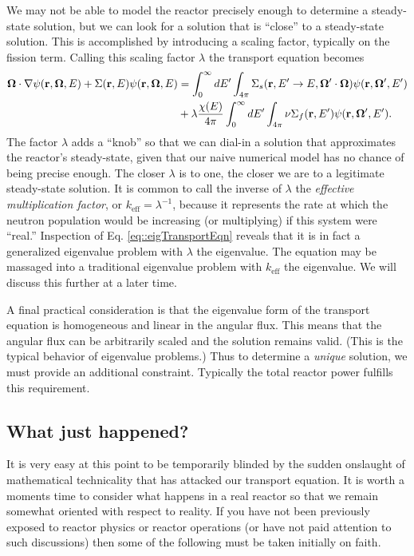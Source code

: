 \documentclass[11pt]{article}
\renewcommand\vec{\mathbf}
\begin{document}
We may not be able to model the reactor precisely enough to determine a steady-state solution, but we can look for a solution that is ``close'' to a steady-state solution.  This is accomplished by introducing a scaling factor, typically on the fission term.  Calling this scaling factor \(\lambda\) the transport equation becomes
\begin{align}
  \vec{\Omega} \cdot \nabla\psi(\vec{r},\vec{\Omega},E)
  + \Sigma(\vec{r},E) \psi(\vec{r},\vec{\Omega},E)
  &= \int_0^\infty dE' \int_{4\pi} \Sigma_s(\vec{r},E' \rightarrow E, \vec{\Omega}'\cdot\vec{\Omega}) \psi(\vec{r},\vec{\Omega}',E') \notag\\
  &+ \lambda\frac{\chi(E)}{4\pi} \int_0^\infty dE' \int_{4\pi} \nu\Sigma_f(\vec{r},E') \psi(\vec{r},\vec{\Omega}',E').
  \label{eq::eigTransportEqn}
\end{align}
The factor \(\lambda\) adds a ``knob'' so that we can dial-in a solution that approximates the reactor's steady-state, given that our naive numerical model has no chance of being precise enough.  The closer \(\lambda\) is to one, the closer we are to a legitimate steady-state solution.  It is common to call the inverse of \(\lambda\) the \emph{effective multiplication factor}, or \(k_\text{eff} = \lambda^{-1}\), because it represents the rate at which the neutron population would be increasing (or multiplying) if this system were ``real.''  Inspection of Eq. \eqref{eq::eigTransportEqn} reveals that it is in fact a generalized eigenvalue problem with \(\lambda\) the eigenvalue.  The equation may be massaged into a traditional eigenvalue problem with \(k_\text{eff}\) the eigenvalue.  We will discuss this further at a later time.

A final practical consideration is that the eigenvalue form of the transport equation is homogeneous and linear in the angular flux.  This means that the angular flux can be arbitrarily scaled and the solution remains valid.  (This is the typical behavior of eigenvalue problems.)  Thus to determine a \emph{unique} solution, we must provide an additional constraint.  Typically the total reactor power fulfills this requirement.

\subsection{What just happened?}
\label{sec:orgheadline8}
It is very easy at this point to be temporarily blinded by the sudden onslaught of mathematical technicality that has attacked our transport equation.  It is worth a moments time to consider what happens in a real reactor so that we remain somewhat oriented with respect to reality.  If you have not been previously exposed to reactor physics or reactor operations (or have not paid attention to such discussions) then some of the following must be taken initially on faith.
\end{document}
